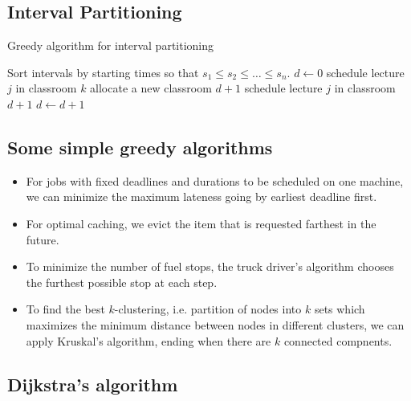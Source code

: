 \documentclass[10pt, oneside, reqno]{amsart}
\theoremstyle{plain}%
\theoremstyle{definition}
\theoremstyle{remark}
\begin{document}
\subsection{Interval Partitioning} %
\label{sub:interval_partitioning}

\begin{algorithm}[H]
    \label{alg:dynamic_rising_trend}
    \caption{Greedy algorithm for interval partitioning}
    \begin{algorithmic}[1]
            \State Sort intervals by starting times so that $s_1 \leq s_2 \leq \dots \leq s_n$.
            \State $d \gets 0$
                    \State schedule lecture $j$ in classroom $k$
                \Else
                    \State allocate a new classroom $d+1$
                    \State schedule lecture $j$ in classroom $d+1$
                    \State $d \gets d+1$
                \EndIf
            \EndFor
    \EndProcedure
    \end{algorithmic}
\end{algorithm}


\subsection{Some simple greedy algorithms} %
\begin{itemize}
\item For jobs with fixed deadlines and durations to be scheduled on one machine, we can minimize the maximum lateness going by earliest deadline first.
\item For optimal caching, we evict the item that is requested farthest in the future.
\item To minimize the number of fuel stops, the truck driver's algorithm chooses the furthest possible stop at each step.
\item To find the best $k$-clustering, i.e. partition of nodes into $k$ sets which maximizes the minimum distance between nodes in different clusters, we can apply Kruskal's algorithm, ending when there are $k$ connected compnents.
\end{itemize}
\subsection{Dijkstra's algorithm} %
\label{sub:dijkstra_s_algorithm}
\end{document}
